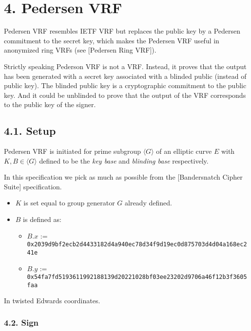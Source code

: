 \documentclass[
]{article}
\providecommand{\tightlist}{%
  \setlength{\itemsep}{0pt}\setlength{\parskip}{0pt}}
\begin{document}
\hypertarget{pedersen-vrf}{%
\section{4. Pedersen VRF}\label{pedersen-vrf}}

Pedersen VRF resembles IETF VRF but replaces the public key by a
Pedersen commitment to the secret key, which makes the Pedersen VRF
useful in anonymized ring VRFs (see {[}Pedersen Ring VRF{]}).

Strictly speaking Pederson VRF is not a VRF. Instead, it proves that the
output has been generated with a secret key associated with a blinded
public (instead of public key). The blinded public key is a
cryptographic commitment to the public key. And it could be unblinded to
prove that the output of the VRF corresponds to the public key of the
signer.

\hypertarget{setup}{%
\subsection{4.1. Setup}\label{setup}}

Pedersen VRF is initiated for prime subgroup \(\langle G \rangle\) of an
elliptic curve \(E\) with \(K, B \in \langle G \rangle\) defined to be
the \emph{key base} and \emph{blinding base} respectively.

In this specification we pick as much as possible from the
{[}Bandersnatch Cipher Suite{]} specification.

\begin{itemize}
\tightlist
\item
  \(K\) is set equal to group generator \(G\) already defined.
\item
  \(B\) is defined as:

  \begin{itemize}
  \tightlist
  \item
    \(B.x\) :=
    \texttt{0x2039d9bf2ecb2d4433182d4a940ec78d34f9d19ec0d875703d4d04a168ec241e}
  \item
    \(B.y\) :=
    \texttt{0x54fa7fd5193611992188139d20221028bf03ee23202d9706a46f12b3f3605faa}
  \end{itemize}
\end{itemize}

In twisted Edwards coordinates.

\hypertarget{sign-1}{%
\subsubsection{4.2. Sign}\label{sign-1}}
\end{document}

